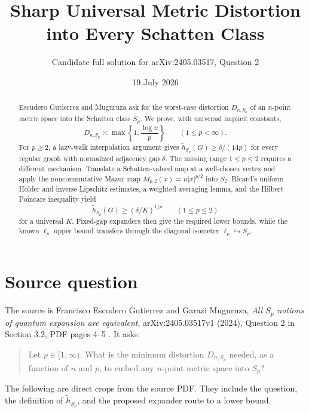 \documentclass[11pt]{article}
\title{Sharp Universal Metric Distortion into Every Schatten Class}
\author{Candidate full solution for arXiv:2405.03517, Question 2}
\date{19 July 2026}
\begin{document}
\maketitle

\begin{center}
\end{center}

\begin{abstract}
Escudero Gutierrez and Muguruza ask for the worst-case distortion
$D_{n,S_p}$ of an $n$-point metric space into the Schatten class $S_p$.
We prove, with universal implicit constants,
\[
 D_{n,S_p}\asymp \max\left\{1,\frac{\log n}{p}\right\}
 \qquad(1\le p<\infty).
\]
For $p\ge2$, a lazy-walk interpolation argument gives
$\widetilde h_{S_p}(G)\ge\delta/(14p)$ for every regular graph with
normalized adjacency gap $\delta$.  The missing range $1\le p\le2$
requires a different mechanism.  Translate a Schatten-valued map at a
well-chosen vertex and apply the noncommutative Mazur map
$M_{p,2}(x)=u|x|^{p/2}$ into $S_2$.  Ricard's uniform Holder and inverse
Lipschitz estimates, a weighted averaging lemma, and the Hilbert Poincare
inequality yield
\[
 \widetilde h_{S_p}(G)\ge (\delta/K)^{1/p}\qquad(1\le p\le2)
\]
for a universal $K$.  Fixed-gap expanders then give the required lower
bounds, while the known $\ell_p$ upper bound transfers through the
diagonal isometry $\ell_p\hookrightarrow S_p$.
\end{abstract}

\section{Source question}

The source is Francisco Escudero Gutierrez and Garazi Muguruza,
\emph{All $S_p$ notions of quantum expansion are equivalent},
arXiv:2405.03517v1 (2024), Question 2 in Section 3.2, PDF pages 4--5
\cite{source}.  It asks:

\begin{quote}
Let $p\in[1,\infty)$. What is the minimum distortion $D_{n,S_p}$
needed, as a function of $n$ and $p$, to embed any $n$-point metric
space into $S_p$?
\end{quote}

The following are direct crops from the source PDF.  They include the
question, the definition of $\widetilde h_{S_p}$, and the proposed
expander route to a lower bound.
\end{document}
